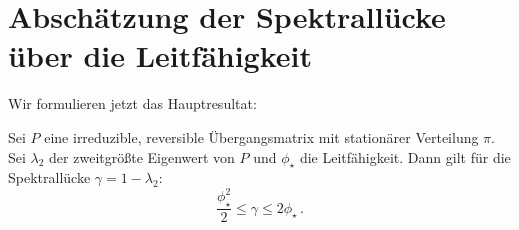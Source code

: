 \documentclass[ngerman,a4paper,11pt]{scrartcl}
\begin{document}
\section{Abschätzung der Spektrallücke über die Leitfähigkeit}
Wir formulieren jetzt das Hauptresultat:
\begin{thmbk}
 \label{thm:haupt}
 Sei $P$ eine irreduzible, reversible Übergangsmatrix mit stationärer Verteilung $\pi$.
 Sei $\lambda_2$ der zweitgrößte Eigenwert von $P$ und $\phi_\star$ die Leitfähigkeit.
 Dann gilt für die Spektrallücke $\gamma=1-\lambda_2$:
 \begin{equation}
  \frac{\phi_\star^2}{2}\leq\gamma\leq 2\phi_\star\, .
 \end{equation}
\end{thmbk}
\end{document}
